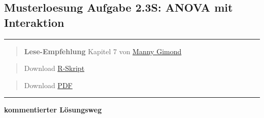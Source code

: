 \documentclass[
]{article}
\author{}
\date{\vspace{-2.5em}}
\begin{document}
\hypertarget{musterloesung-aufgabe-2.3s-anova-mit-interaktion}{%
\subsection{Musterloesung Aufgabe 2.3S: ANOVA mit
Interaktion}\label{musterloesung-aufgabe-2.3s-anova-mit-interaktion}}

\begin{center}\rule{0.5\linewidth}{0.5pt}\end{center}

\begin{quote}
\textbf{Lese-Empfehlung} Kapitel 7 von
\href{https://mgimond.github.io/Stats-in-R/ANOVA.html}{Manny Gimond}
\end{quote}

\begin{quote}
Download \href{14_Statistik2/RFiles/solution_stat2.3s.R}{R-Skript}
\end{quote}

\begin{quote}
Download \href{14_Statistik2/RFiles/solution_stat2.3s.pdf}{PDF}
\end{quote}

\begin{center}\rule{0.5\linewidth}{0.5pt}\end{center}

\textbf{kommentierter Lösungsweg}
\end{document}
